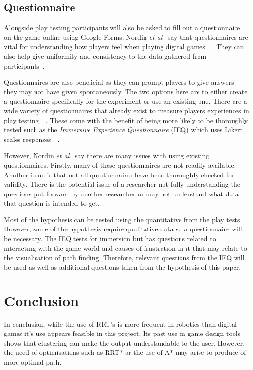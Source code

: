 \documentclass[journal]{IEEEtran}
\begin{document}
\subsection{Questionnaire}
Alongside play testing participants will also be asked to fill out a questionnaire on the game online using Google Forms. Nordin \textit{et al}~\cite{nordin2014} say that questionnaires are vital for understanding how players feel when playing digital games~\cite{nordin2014}~\cite{Denisova2016}. They can also help give uniformity and consistency to the data gathered from participants~\cite{Denisova2016}.

Questionnaires are also beneficial as they can prompt players to give answers they may not have given spontaneously. The two options here are to either create a questionnaire specifically for the experiment or use an existing one. There are a wide variety of questionnaires that already exist to measure players experiences in play testing~\cite{nordin2014}~\cite{Jennett2008}. These come with the benefit of being more likely to be thoroughly tested such as the \textit{Immersive  Experience
Questionnaire} (IEQ) which uses Likert scales responses~\cite{nordin2014}~\cite{Jennett2008}.
 
However, Nordin \textit{et al}~\cite{nordin2014} say there are many issues with using existing questionnaires. Firstly, many of these questionnaires are not readily available. Another issue is that not all questionnaires have been thoroughly checked for validity. There is the potential issue of a researcher not fully understanding the questions put forward by another researcher or may not understand what data that question is intended to get.

Most of the hypothesis can be tested using the quantitative from the play tests. However, some of the hypothesis require qualitative data so a questionnaire will be necessary.  The IEQ tests for immersion but has questions related to interacting with the game world and causes of frustration in it that may relate to the visualisation of path finding.  Therefore, relevant questions from the IEQ will be used as well as additional questions taken from the hypothesis of this paper.


\section{Conclusion}
In conclusion, while the use of RRT's is more frequent in robotics than digital games it's use appears feasible in this project. Its past use in game design tools shows that clustering can make the output understandable to the user. However,  the need of optimisations  such as RRT* or the use of A* may arise to produce of more optimal path. 
\end{document}
